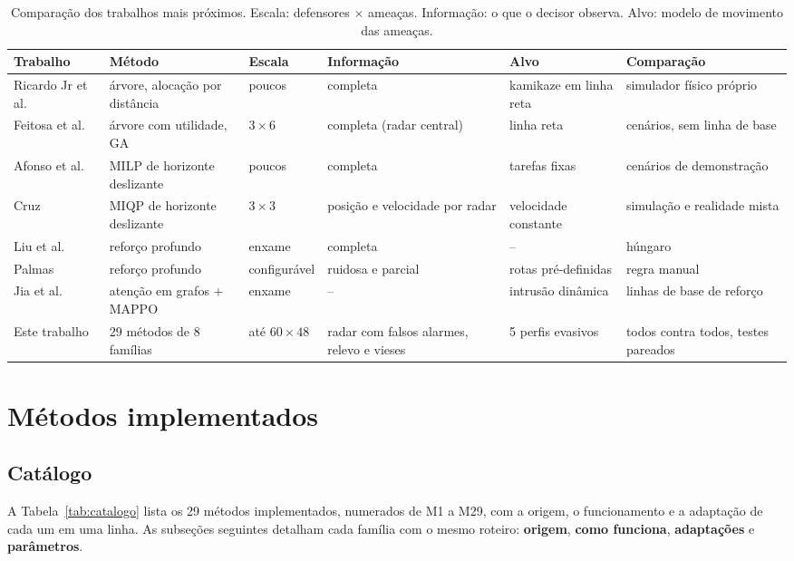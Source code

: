 \documentclass[11pt,a4paper]{article}
\begin{document}
\begin{table}[t]
\centering
\caption{Comparação dos trabalhos mais próximos. Escala: defensores $\times$ ameaças. Informação: o que o decisor
observa. Alvo: modelo de movimento das ameaças.}
\label{tab:relacionados}
\scriptsize
\renewcommand{\arraystretch}{1.25}
\begin{tabularx}{\textwidth}{@{}>{\raggedright}p{2.2cm}>{\raggedright}p{2.6cm}>{\raggedright}p{1.6cm}>{\raggedright}p{2.2cm}>{\raggedright}p{2.0cm}>{\raggedright\arraybackslash}X@{}}
\toprule
Trabalho & Método & Escala & Informação & Alvo & Comparação \\
\midrule
Ricardo Jr et al.~\cite{ricardo2023} & árvore, alocação por distância & poucos & completa & kamikaze em linha reta & simulador físico próprio \\
Feitosa et al.~\cite{feitosa2025} & árvore com utilidade, GA & $3\times6$ & completa (radar central) & linha reta & 9 cenários, sem linha de base \\
Afonso et al.~\cite{afonso2020} & MILP de horizonte deslizante & poucos & completa & tarefas fixas & cenários de demonstração \\
Cruz~\cite{cruz2025} & MIQP de horizonte deslizante & $3\times3$ & posição e velocidade por radar & velocidade constante & simulação e realidade mista \\
Liu et al.~\cite{liu2023drones} & reforço profundo & enxame & completa & -- & húngaro \\
Palmas~\cite{palmas2025} & reforço profundo & configurável & ruidosa e parcial & rotas pré-definidas & regra manual \\
Jia et al.~\cite{jia2026} & atenção em grafos + MAPPO & enxame & -- & intrusão dinâmica & linhas de base de reforço \\
\midrule
Este trabalho & 29 métodos de 8 famílias & até $60\times48$ & radar com falsos alarmes, relevo e vieses & 5 perfis evasivos & todos contra todos, testes pareados \\
\bottomrule
\end{tabularx}
\end{table}

\section{Métodos implementados}\label{sec:metodos}

\subsection{Catálogo}
A Tabela~\ref{tab:catalogo} lista os 29 métodos implementados, numerados de M1 a M29, com a origem, o funcionamento e
a adaptação de cada um em uma linha. As subseções seguintes detalham cada família com o mesmo roteiro: \textbf{origem},
\textbf{como funciona}, \textbf{adaptações} e \textbf{parâmetros}.
\end{document}
